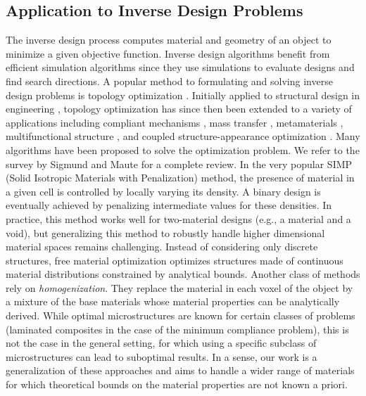 \subsection{Application to Inverse Design Problems}
The inverse design process computes material and geometry of an object to minimize a given objective function.
Inverse design algorithms benefit from efficient simulation algorithms since they use simulations to evaluate designs and find search directions.
A popular method to formulating and solving inverse design problems is topology optimization \cite{bendsoe2004topology}.
Initially applied to structural design in engineering \cite{bendsoe:1989:optimal}, topology optimization has since then been extended to a variety of applications including compliant mechanisms \cite{Sigmund97Compliant},
mass transfer \cite{challis:2009:level}, metamaterials \cite{sigmund:1996:composites,cadman:2013:design}, multifunctional structure \cite{yan:2015:two}, and coupled structure-appearance optimization \cite{Martinez:2015:SAO}.
Many algorithms have been proposed to solve the optimization problem.
We refer to the survey by Sigmund and Maute \cite{sigmund:2013:topology} for a complete review.
In the very popular SIMP (Solid Isotropic Materials with Penalization) method, the presence of material in a given cell is controlled by locally varying its density. A binary design is eventually achieved by penalizing intermediate values for these densities. In practice, this method works well for two-material designs (e.g., a material and a void), but generalizing this method to robustly handle higher dimensional material spaces remains challenging.
Instead of considering only discrete structures, free material optimization \cite{Ringertz1993On,haber1994analytical} optimizes structures made of continuous material distributions constrained by analytical bounds.
Another class of methods rely on {\it homogenization}. They replace the material in each voxel of the object by a mixture of the base materials whose material properties can be analytically derived. While optimal microstructures are known for certain classes of problems (laminated composites in the case of the minimum compliance problem), this is not the case in the general setting, for which using a specific subclass of microstructures can lead to suboptimal results.
In a sense, our work is a generalization of these approaches and aims to handle a wider range of materials for which theoretical bounds on the material properties are not known a priori.

